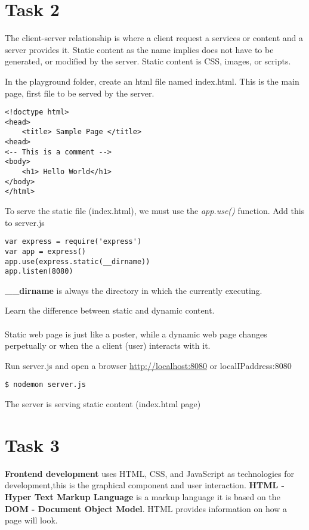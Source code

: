 \documentclass[12pt]{article}
\begin{document}
\section*{Task 2} 
The client-server relationship is where a client request a services or content and a server provides it. Static content as the name implies does not have to be generated, or modified by the server. Static content is CSS, images, or scripts. 
\begin{todolist}
    \item In the playground folder, create an html file named index.html. This is the main page, first file to be served by the server.  
\begin{lstlisting}
<!doctype html> 
<head> 
    <title> Sample Page </title> 
<head> 
<-- This is a comment --> 
<body> 
    <h1> Hello World</h1> 
</body> 
</html> 
\end{lstlisting}
    \item To serve the static file (index.html), we must use the \textit{app.use()} function. Add this to server.js 
\begin{lstlisting}
var express = require('express')
var app = express()
app.use(express.static(__dirname))
app.listen(8080)
\end{lstlisting}
    \textbf{\_\_dirname} is always the directory in which the currently executing. 
    \item Learn the difference between static and dynamic content. \\ \\
    Static web page is just like a poster, while a dynamic web page changes perpetually or when the a client (user) interacts with it. 
    
    \item Run server.js and open a browser \href{http://localhost/}{http://localhost:8080} or localIPaddress:8080
\begin{lstlisting}
$ nodemon server.js 
\end{lstlisting}
The server is serving static content (index.html page) 
\end{todolist}
\section*{Task 3}
\textbf{Frontend development} uses HTML, CSS, and JavaScript as technologies for development,this is the graphical component and user interaction. \textbf{HTML - Hyper Text Markup Language} is a markup language it is based on the \textbf{DOM - Document Object Model}. HTML provides information on how a page will look. \\
\end{document}
